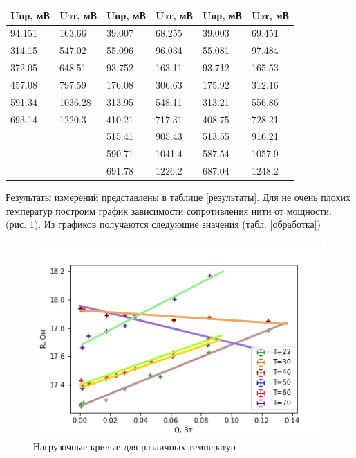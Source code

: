 \documentclass[a4paper,12pt]{article} %
\begin{document}
\begin{table}[h!]
\begin{tabular}{|ll|ll|ll|}
\multicolumn{1}{|l|}{Uпр, мВ} & Uэт, мВ & \multicolumn{1}{l|}{Uпр, мВ} & Uэт, мВ & \multicolumn{1}{l|}{Uпр, мВ} & Uэт, мВ \\ \hline
\multicolumn{1}{|l|}{94.151}  & 163.66  & \multicolumn{1}{l|}{39.007}  & 68.255  & \multicolumn{1}{l|}{39.003}  & 69.451  \\ \hline
\multicolumn{1}{|l|}{314.15}  & 547.02  & \multicolumn{1}{l|}{55.096}  & 96.034  & \multicolumn{1}{l|}{55.081}  & 97.484  \\ \hline
\multicolumn{1}{|l|}{372.05}  & 648.51  & \multicolumn{1}{l|}{93.752}  & 163.11  & \multicolumn{1}{l|}{93.712}  & 165.53  \\ \hline
\multicolumn{1}{|l|}{457.08}  & 797.59  & \multicolumn{1}{l|}{176.08}  & 306.63  & \multicolumn{1}{l|}{175.92}  & 312.16  \\ \hline
\multicolumn{1}{|l|}{591.34}  & 1036.28 & \multicolumn{1}{l|}{313.95}  & 548.11  & \multicolumn{1}{l|}{313.21}  & 556.86  \\ \hline
\multicolumn{1}{|l|}{693.14}  & 1220.3  & \multicolumn{1}{l|}{410.21}  & 717.31  & \multicolumn{1}{l|}{408.75}  & 728.21  \\ \hline
\multicolumn{1}{|l|}{}        &         & \multicolumn{1}{l|}{515.41}  & 905.43  & \multicolumn{1}{l|}{513.55}  & 916.21  \\ \hline
\multicolumn{1}{|l|}{}        &         & \multicolumn{1}{l|}{590.71}  & 1041.4  & \multicolumn{1}{l|}{587.54}  & 1057.9  \\ \hline
\multicolumn{1}{|l|}{}        &         & \multicolumn{1}{l|}{691.78}  & 1226.2  & \multicolumn{1}{l|}{687.04}  & 1248.2  \\ \hline
\end{tabular}
\end{table}
Результаты измерений представлены в таблице \ref{результаты}.
Для не очень плохих температур построим график зависимости сопротивления нити от мощности. (рис. \ref{нагрузка}). Из графиков получаются следующие значения (табл. \ref{обработка})
\begin{figure}[h!]
\begin{center}
\includegraphics[width=\textwidth]{Нагрузка}\end{center}
\caption{Нагрузочные кривые для различных температур} \label{нагрузка}
\end{figure}
\end{document}

